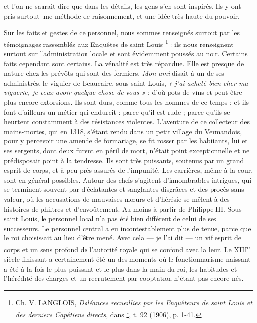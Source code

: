 \documentclass[french,twoside]{book} %
\begin{document}
\label{p42} et l’on ne saurait dire que dans les détails, les gens s’en sont inspirés. Ils y ont pris surtout une méthode de raisonnement, et une idée très haute du pouvoir.\par
Sur les faits et gestes de ce personnel, nous sommes renseignés surtout par les témoignages rassemblés aux Enquêtes de saint Louis \footnote{ Ch. V. LANGLOIS, {\itshape Doléances recueillies par les Enquêteurs de saint Louis et des derniers Capétiens directs}, dans \href{http://gallica.bnf.fr/document?O=N018186}{}\footnote{\href{http://gallica.bnf.fr/document?O=N018186}{http://gallica.bnf.fr/document?O=N018186}}, t. 92 (1906), p. 1-41.} : ils nous renseignent surtout sur l’administration locale et sont évidemment poussés au noir. Certains faits cependant sont certains. La vénalité est très répandue. Elle est presque de nature chez les prévôts qui sont des fermiers. \emph{Mon ami} disait à un de ses administrés, le viguier de Beaucaire, sous saint Louis, \emph{« j’ai acheté bien cher ma viguerie, je veux avoir quelque chose de vous »} : d’où pots de vins et peut-être plus encore extorsions. Ils sont durs, comme tous les hommes de ce temps ; et ils font d’ailleurs un métier qui endurcit : parce qu’il est rude ; parce qu’ils se heurtent constamment à des résistances violentes. L’aventure de ce collecteur des mains-mortes, qui en 1318, s’étant rendu dans un petit village du Vermandois, pour y percevoir une amende de formariage, se fit rosser par les habitants, lui et ses sergents, dont deux furent en péril de mort, n’était point exceptionnelle et ne prédisposait point à la tendresse. Ils sont très puissants, soutenus par un grand esprit de corps, et à peu près assurés de l’impunité. Les carrières, même à la cour, sont en général possibles. Autour des chefs s’agitent d’innombrables intrigues, qui se terminent souvent par d’éclatantes et sanglantes disgrâces et des procès sans valeur, où les accusations de mauvaises mœurs et d’hérésie se mêlent à des histoires de philtres et d’envoûtement. Au moins à partir de Philippe III. Sous saint Louis, le personnel local n’a pas été bien différent de celui de ses successeurs. Le personnel central a eu incontestablement plus de tenue, parce que le roi choisissait au lieu d’être mené. Avec cela — je l’ai dit — un vif esprit de corps et un sens profond de l’autorité royale qui se confond avec la leur. Le XIII\textsuperscript{e} siècle finissant a certainement été un des moments où le fonctionnarisme naissant a été à la fois le plus puissant et le plus dans la main du roi, les habitudes et l’hérédité des charges et un recrutement par cooptation n’étant pas encore nés.
\end{document}
